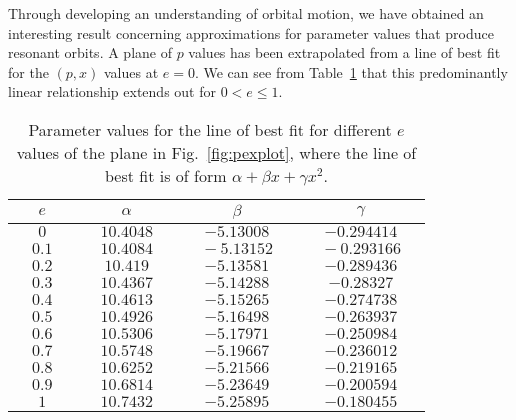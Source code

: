 Through developing an understanding of orbital motion, we have obtained an interesting result concerning approximations for parameter values that produce resonant orbits.
A plane of $p$ values has been extrapolated from a line of best fit for the $(p,x)$ values at $e=0$.
We can see from Table~\ref{table:fitvaluesAlle} that this predominantly linear relationship extends out for $0<e\leq 1$.

\begin{table}[!ht]
\begin{center}
\begin{tabular}{|c|c|c|c|}
\hline
     $e$ & $\alpha$ & $\beta$ & $\gamma$ \\
     \hline
     $0$ & $10.4048$ & $-5.13008$ & $-0.294414$ \\
     \hline
     $\quad 0.1\quad $ & $\quad 10.4084 \quad$ & $\quad -5.13152 \quad$ & $\quad -0.293166 \quad$ \\
     \hline
     $0.2$ & $10.419$ & $-5.13581$ & $-0.289436$\\
     \hline
     $0.3$ & $10.4367$ & $-5.14288$ & $-0.28327$\\
     \hline
     $0.4$ & $10.4613$ & $-5.15265$ & $-0.274738$\\
     \hline
     $0.5$ & $10.4926$ & $-5.16498$ & $-0.263937$\\
     \hline
     $0.6$ & $10.5306$ & $-5.17971$ & $-0.250984$\\
     \hline
     $0.7$ & $10.5748$ & $-5.19667$ & $-0.236012$\\
     \hline
     $0.8$ & $10.6252$ & $-5.21566$ & $-0.219165$\\
     \hline
     $0.9$ & $10.6814$ & $-5.23649$ & $-0.200594$\\
     \hline
     $1$ & $10.7432$ & $-5.25895$ & $-0.180455$\\
     \hline
\end{tabular}
\caption[Parameter values for the quadratic line of best fit for different $e$ values of the $(p,e,x)$ plane]{Parameter values for the line of best fit for different $e$ values of the plane in Fig.~\eqref{fig:pexplot}, where the line of best fit is of form $\alpha + \beta x +\gamma x^2$.}
\label{table:fitvaluesAlle}
\end{center}
\end{table}

